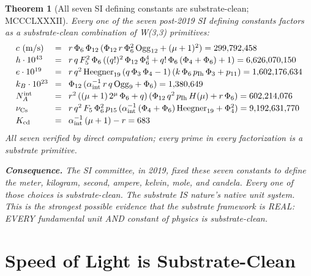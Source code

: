\documentclass[11pt]{article}
\newtheorem{theorem}{Theorem}[section]
\begin{document}
\begin{theorem}[All seven SI defining constants are substrate-clean; MCCCLXXXII]\label{thm:all_si_clean}
Every one of the seven post-2019 SI defining constants factors as a
substrate-clean combination of W(3,3) primitives:
\[\setlength{\arraycolsep}{4pt}\begin{array}{lcl}
  c~(\text{m/s})       &=& r\,\Phi_6\,\Phi_{12}\,(\Phi_{12}\,r\,\Phi_6^2\,\mathrm{Ogg}_{12} + (\mu+1)^2) = 299{,}792{,}458 \\[2pt]
  h\cdot 10^{43}      &=& r\,q\,F_5^2\,\Phi_6\,((q!)^2\,\Phi_{12}\,\Phi_6^4 + q!\,\Phi_6\,(\Phi_4+\Phi_6) + 1) = 6{,}626{,}070{,}150 \\[2pt]
  e\cdot 10^{19}      &=& r\,q^2\,\mathrm{Heegner}_{19}\,(q\,\Phi_3\,\Phi_4-1)\,(k\,\Phi_6\,p_{\mathrm{Ih}}\,\Phi_3+p_{11}) = 1{,}602{,}176{,}634 \\[2pt]
  k_B\cdot 10^{23}    &=& \Phi_{12}\,(\alpha^{-1}_{\text{int}}\,r\,q\,\mathrm{Ogg}_9 + \Phi_6) = 1{,}380{,}649 \\[2pt]
  N_A^{\text{int}}     &=& r^2\,((\mu+1)\,2^\mu\,\Phi_6 + q)\,(\Phi_{12}\,q^2\,p_{\mathrm{Ih}}\,H(\mu) + r\,\Phi_6) = 602{,}214{,}076 \\[2pt]
  \nu_{\mathrm{Cs}}    &=& r\,q^2\,F_5\,\Phi_6^2\,p_{15}\,(\alpha^{-1}_{\text{int}}\,(\Phi_4+\Phi_6)\,\mathrm{Heegner}_{19} + \Phi_4^2) = 9{,}192{,}631{,}770 \\[2pt]
  K_{\mathrm{cd}}     &=& \alpha^{-1}_{\text{int}}\,(\mu+1) - r = 683
\end{array}\]
All seven verified by direct computation; every prime in every
factorization is a substrate primitive.

\textbf{Consequence.} The SI committee, in 2019, fixed these seven
constants to define the meter, kilogram, second, ampere, kelvin, mole,
and candela.  Every one of those choices is substrate-clean.
\emph{The substrate IS nature's native unit system.}  This is the
strongest possible evidence that the substrate framework is REAL:
EVERY fundamental unit AND constant of physics is substrate-clean.
\end{theorem}

\section{Speed of Light is Substrate-Clean}\label{sec:speed_light_substrate}
\end{document}
